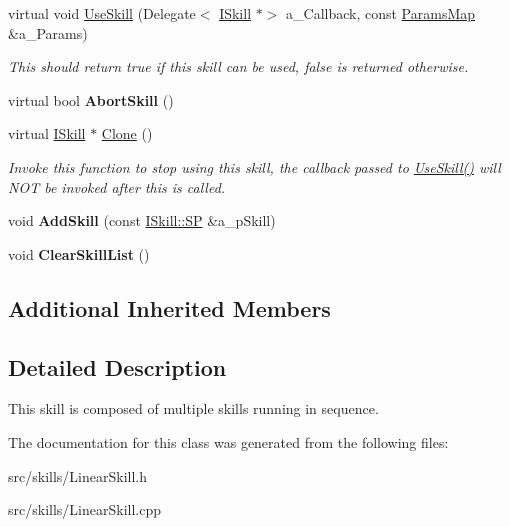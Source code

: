 \begin{DoxyCompactItemize}
\mbox{\label{class_linear_skill_a63f85339807231fb81997e88de3f612f}} 
virtual void \hyperlink{class_linear_skill_a63f85339807231fb81997e88de3f612f}{Use\+Skill} (Delegate$<$ \hyperlink{class_i_skill}{I\+Skill} $\ast$$>$ a\+\_\+\+Callback, const \hyperlink{class_params_map}{Params\+Map} \&a\+\_\+\+Params)
\begin{DoxyCompactList}\small\item\em This should return true if this skill can be used, false is returned otherwise. \end{DoxyCompactList}\item 
\mbox{\label{class_linear_skill_a8dfd88fb0cb469cec683ea35864977b2}} 
virtual bool {\bfseries Abort\+Skill} ()
\item 
\mbox{\label{class_linear_skill_a8d93777dac067feeea15fb493a20c701}} 
virtual \hyperlink{class_i_skill}{I\+Skill} $\ast$ \hyperlink{class_linear_skill_a8d93777dac067feeea15fb493a20c701}{Clone} ()
\begin{DoxyCompactList}\small\item\em Invoke this function to stop using this skill, the callback passed to \hyperlink{class_linear_skill_a63f85339807231fb81997e88de3f612f}{Use\+Skill()} will N\+OT be invoked after this is called. \end{DoxyCompactList}\item 
\mbox{\label{class_linear_skill_aec9d06d2c6cb14bc93a92c021b6afd0a}} 
void {\bfseries Add\+Skill} (const \hyperlink{class_i_skill_a68bcce999ab0444eebaca3fb8ddb8a31}{I\+Skill\+::\+SP} \&a\+\_\+p\+Skill)
\item 
\mbox{\label{class_linear_skill_a2a31e08a88425b7ee89c7f7fef24a77b}} 
void {\bfseries Clear\+Skill\+List} ()
\end{DoxyCompactItemize}
\subsection*{Additional Inherited Members}


\subsection{Detailed Description}
This skill is composed of multiple skills running in sequence. 

The documentation for this class was generated from the following files\+:\begin{DoxyCompactItemize}
\item 
src/skills/Linear\+Skill.\+h\item 
src/skills/Linear\+Skill.\+cpp\end{DoxyCompactItemize}
